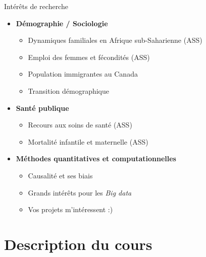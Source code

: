 \documentclass[xcolor=table]{beamer}
\begin{document}

\begin{frame}{Intérêts de recherche}

\begin{itemize}
  \item \textbf{Démographie / Sociologie}
  \begin{itemize}
  	\item Dynamiques familiales en Afrique sub-Saharienne (ASS)
    \item Emploi des femmes et fécondités (ASS)
    \item Population immigrantes au Canada
    \item Transition démographique 
  \end{itemize}
  \item \textbf{Santé publique}
  \begin{itemize}
  	\item Recours aux soins de santé (ASS)
    \item Mortalité infantile et maternelle (ASS)
  \end{itemize}
  \item \textbf{Méthodes quantitatives et computationnelles}
  \begin{itemize}
  	\item Causalité et ses biais
    \item Grands intérêts pour les \textit{Big data}
    \item Vos projets m'intéressent :)
  \end{itemize}
\end{itemize}

\vskip 1cm
\end{frame}

\section{Description du cours}
\end{document}
